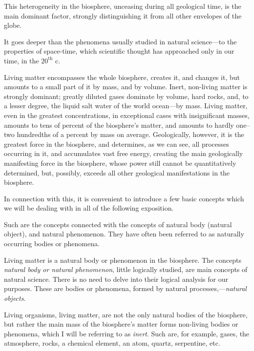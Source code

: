 This heterogeneity in the biosphere, unceasing during all geological time, is
the main dominant factor, strongly distinguishing it from all other envelopes
of the globe.

It goes deeper than the phenomena usually studied in natural science---to the
properties of space-time, which scientific thought has approached only in our
time, in the $20^\mathrm{th}$ c.

Living matter encompasses the whole biosphere, creates it, and changes it, but
amounts to a small part of it by mass, and by volume.  Inert, non-living matter
is strongly dominant; greatly diluted gases dominate by volume, hard rocks,
and, to a lesser degree, the liquid salt water of the world ocean---by mass.
Living matter, even in the greatest concentrations, in exceptional cases with
insignificant masses, amounts to tens of percent of the biosphere's matter, and
amounts to hardly one--two hundredths of a percent by mass on average.
Geologically, however, it is the greatest force in the biosphere, and
determines, as we can see, all processes occurring in it, and accumulates vast
free energy, creating the main geologically manifesting force in the biosphere,
whose power still cannot be quantitatively determined, but, possibly, exceeds
all other geological manifestations in the biosphere.

In connection with this, it is convenient to introduce a few basic concepts
which we will be dealing with in all of the following exposition.


\Section \label{sec:6} %
Such are the concepts connected with the concepts of natural body (natural
object), and natural
phenomenon.  They have often been referred to
as naturally occurring bodies or phenomena.

Living matter is a natural body or phenomenon in the biosphere.  The concepts
\emph{natural body or natural phenomenon}, little logically studied, are main
concepts of natural science.  There is no need to delve into their logical
analysis for our purposes.  These are bodies or phenomena, formed by natural
processes,---\emph{natural objects}.

Living organisms, living matter, are not the only natural bodies of the
biosphere, but rather the main mass of the biosphere's matter forms non-living
bodies or phenomena, which I will be referring to as
\emph{inert}.  Such are, for example, gases, the
atmosphere, rocks, a chemical element, an atom, quartz, serpentine, etc.

